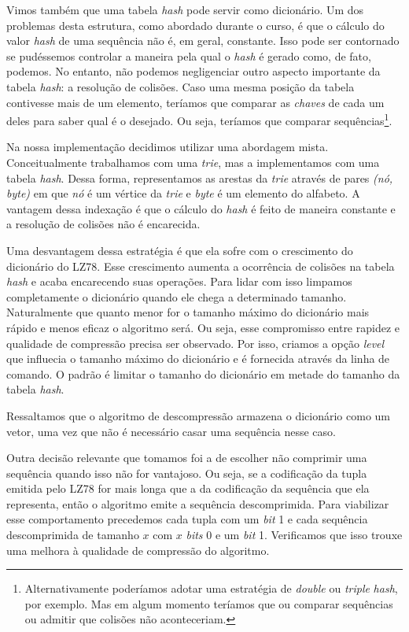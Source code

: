 \documentclass[]{article}
\begin{document}
Vimos também que uma tabela \textit{hash} pode servir como dicionário. Um dos problemas desta estrutura, como abordado durante o curso, é que o cálculo do valor \textit{hash} de uma sequência não é, em geral, constante. Isso pode ser contornado se pudéssemos controlar a maneira pela qual o \textit{hash} é gerado como, de fato, podemos. No entanto, não podemos negligenciar outro aspecto importante da tabela \textit{hash}: a resolução de colisões. Caso uma mesma posição da tabela contivesse mais de um elemento, teríamos que comparar as \textit{chaves} de cada um deles para saber qual é o desejado. Ou seja, teríamos que comparar sequências\footnote{Alternativamente poderíamos adotar uma estratégia de \textit{double} ou \textit{triple} \textit{hash}, por exemplo. Mas em algum momento teríamos que ou comparar sequências ou admitir que colisões não aconteceriam.}.

Na nossa implementação decidimos utilizar uma abordagem mista. Conceitualmente trabalhamos com uma \textit{trie}, mas a implementamos com uma tabela \textit{hash}. Dessa forma, representamos as arestas da \textit{trie} através de pares \textit{(nó, byte)} em que \textit{nó} é um vértice da \textit{trie} e \textit{byte} é um elemento do alfabeto. A vantagem dessa indexação é que o cálculo do \textit{hash} é feito de maneira constante e a resolução de colisões não é encarecida.

Uma desvantagem dessa estratégia é que ela sofre com o crescimento do dicionário do LZ78. Esse crescimento aumenta a ocorrência de colisões na tabela \textit{hash} e acaba encarecendo suas operações. Para lidar com isso limpamos completamente o dicionário quando ele chega a determinado tamanho. Naturalmente que quanto menor for o tamanho máximo do dicionário mais rápido e menos eficaz o algoritmo será. Ou seja, esse compromisso entre rapidez e qualidade de compressão precisa ser observado. Por isso, criamos a opção \textit{level} que influecia o tamanho máximo do dicionário e é fornecida através da linha de comando. O padrão é limitar o tamanho do dicionário em metade do tamanho da tabela \textit{hash}.

Ressaltamos que o algoritmo de descompressão armazena o dicionário como um vetor, uma vez que não é necessário casar uma sequência nesse caso.

Outra decisão relevante que tomamos foi a de escolher não comprimir uma sequência quando isso não for vantajoso. Ou seja, se a codificação da tupla emitida pelo LZ78 for mais longa que a da codificação da sequência que ela representa, então o algoritmo emite a sequência descomprimida. Para viabilizar esse comportamento precedemos cada tupla com um \textit{bit} 1 e cada sequência descomprimida de tamanho $x$ com $x$ \textit{bits} 0 e um \textit{bit} 1. Verificamos que isso trouxe uma melhora à qualidade de compressão do algoritmo.
\end{document}
